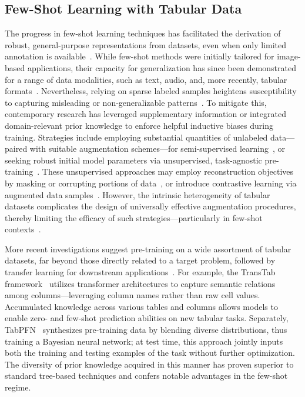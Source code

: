 \subsection{Few-Shot Learning with Tabular Data} The progress in few-shot learning techniques has facilitated the derivation of robust, general-purpose representations from datasets, even when only limited annotation is available~\cite{chen2018closer}. While few-shot methods were initially tailored for image-based applications, their capacity for generalization has since been demonstrated for a range of data modalities, such as text, audio, and, more recently, tabular formats~\cite{majumder2022few,nam2023stunt,schick2021exploiting}. Nevertheless, relying on sparse labeled samples heightens susceptibility to capturing misleading or non-generalizable patterns~\cite{bartlett2021deep}. To mitigate this, contemporary research has leveraged supplementary information or integrated domain-relevant prior knowledge to enforce helpful inductive biases during training. Strategies include employing substantial quantities of unlabeled data—paired with suitable augmentation schemes—for semi-supervised learning~\cite{ucar2021subtab,yoon2020vime}, or seeking robust initial model parameters via unsupervised, task-agnostic pre-training~\cite{somepalli2021saint}. These unsupervised approaches may employ reconstruction objectives by masking or corrupting portions of data~\cite{arik2021tabnet,majmundar2022met}, or introduce contrastive learning via augmented data samples~\cite{bahri2022scarf,chen2020simple}. However, the intrinsic heterogeneity of tabular datasets complicates the design of universally effective augmentation procedures, thereby limiting the efficacy of such strategies—particularly in few-shot contexts~\cite{nam2023stunt}.

More recent investigations suggest pre-training on a wide assortment of tabular datasets, far beyond those directly related to a target problem, followed by transfer learning for downstream applications~\cite{zhang2023generative,levin2022transfer,zhu2023xtab}. For example, the TransTab framework~\cite{wang2022transtab} utilizes transformer architectures to capture semantic relations among columns—leveraging column names rather than raw cell values. Accumulated knowledge across various tables and columns allows models to enable zero- and few-shot prediction abilities on new tabular tasks. Separately, TabPFN~\cite{hollmann2022tabpfn} synthesizes pre-training data by blending diverse distributions, thus training a Bayesian neural network; at test time, this approach jointly inputs both the training and testing examples of the task without further optimization. The diversity of prior knowledge acquired in this manner has proven superior to standard tree-based techniques and confers notable advantages in the few-shot regime.

